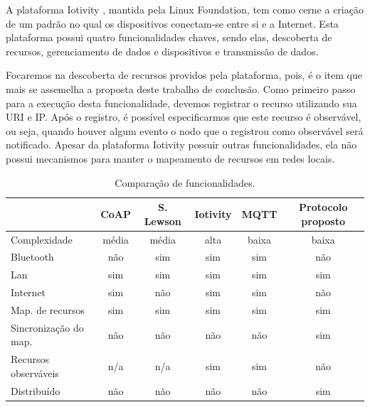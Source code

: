 A plataforma Iotivity \cite{iotivity}, mantida pela Linux Foundation, tem como cerne a criação de um padrão no qual os dispositivos conectam-se entre si e a Internet.
Esta plataforma possui quatro funcionalidades chaves, sendo elas, descoberta de recursos, gerenciamento de dados e dispositivos e transmissão de dados.

Focaremos na descoberta de recursos providos pela plataforma, pois, é o item que mais se assemelha a proposta deste trabalho de conclusão.
Como primeiro passo para a execução desta funcionalidade, devemos registrar o recurso utilizando sua URI e IP.
Após o registro, é possível especificarmos que este recurso é observável, ou seja, quando houver algum evento o nodo que o registrou como observável será notificado.
Apesar da plataforma Iotivity possuir outras funcionalidades, ela não possui mecanismos para manter o mapeamento de recursos em redes locais.

\begin{table}[htb!]
    \centering
    \caption{Comparação de funcionalidades.}
    \begin{tabular}{|l|c|c|c|c|c|}
    \hline
                                   & CoAP  & S. Lewson & Iotivity & MQTT  & Protocolo proposto \\ \hline
    Complexidade                   & média & média     & alta     & baixa & baixa              \\ \hline
    Bluetooth                      & não   & sim       & sim      & sim   & não                \\ \hline
    Lan                            & sim   & sim       & sim      & sim   & sim                \\ \hline
    Internet                       & sim   & não       & sim      & sim   & não                \\ \hline
    Map. de recursos               & sim   & sim       & sim      & sim   & sim                \\ \hline
    Sincronização do map.          & não   & não       & não      & não   & sim                \\ \hline
    Recursos observáveis           & n/a   & n/a       & sim      & sim   & não                \\ \hline
    Distribuído                    & não   & não       & não      & não   & sim                \\ \hline
    \end{tabular}
    \label{table:tab1}
\end{table}
